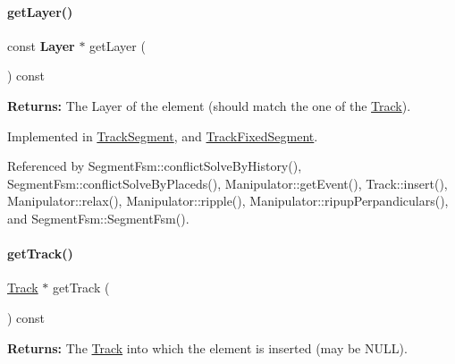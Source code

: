 \mbox{\label{classKite_1_1TrackElement_ad96c66549598873bf68c2e18ec7164c1}} 
\paragraph{\texorpdfstring{get\+Layer()}{getLayer()}}
{\footnotesize\ttfamily const \textbf{ Layer} $\ast$ get\+Layer (\begin{DoxyParamCaption}{ }\end{DoxyParamCaption}) const\hspace{0.3cm}{\ttfamily [pure virtual]}}

{\bfseries Returns\+:} The Layer of the element (should match the one of the \hyperlink{classKite_1_1Track}{Track}). 

Implemented in \hyperlink{classKite_1_1TrackSegment_ab045567c4f529dca7790d66c17c3084f}{Track\+Segment}, and \hyperlink{classKite_1_1TrackFixedSegment_ab045567c4f529dca7790d66c17c3084f}{Track\+Fixed\+Segment}.



Referenced by Segment\+Fsm\+::conflict\+Solve\+By\+History(), Segment\+Fsm\+::conflict\+Solve\+By\+Placeds(), Manipulator\+::get\+Event(), Track\+::insert(), Manipulator\+::relax(), Manipulator\+::ripple(), Manipulator\+::ripup\+Perpandiculars(), and Segment\+Fsm\+::\+Segment\+Fsm().

\mbox{\label{classKite_1_1TrackElement_a3f34f9139b8491a0adb531ac3a904171}} 
\paragraph{\texorpdfstring{get\+Track()}{getTrack()}}
{\footnotesize\ttfamily \hyperlink{classKite_1_1Track}{Track} $\ast$ get\+Track (\begin{DoxyParamCaption}{ }\end{DoxyParamCaption}) const\hspace{0.3cm}{\ttfamily [inline]}}

{\bfseries Returns\+:} The \hyperlink{classKite_1_1Track}{Track} into which the element is inserted (may be {\ttfamily N\+U\+LL}). 


